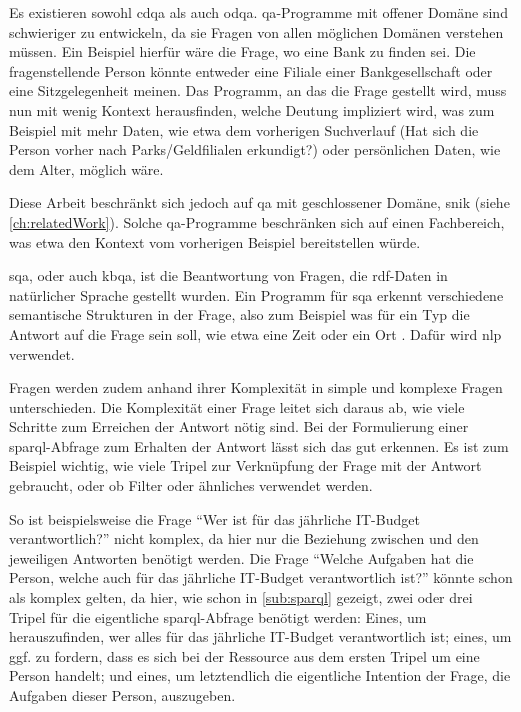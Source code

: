 Es existieren sowohl \ac{cdqa} als auch \ac{odqa}.
\ac{qa}-Programme mit offener Domäne sind schwieriger zu entwickeln,
da sie Fragen von allen möglichen Domänen verstehen müssen.
Ein Beispiel hierfür wäre die Frage, wo eine Bank zu finden sei.
Die fragenstellende Person könnte entweder eine Filiale einer Bankgesellschaft oder eine Sitzgelegenheit meinen.
Das Programm, an das die Frage gestellt wird, muss nun mit wenig Kontext herausfinden,
welche Deutung impliziert wird, was zum Beispiel mit mehr Daten,
wie etwa dem vorherigen Suchverlauf (Hat sich die Person vorher nach Parks/Geldfilialen erkundigt?)
oder persönlichen Daten, wie dem Alter, möglich wäre.

Diese Arbeit beschränkt sich jedoch auf \ac{qa} mit geschlossener Domäne, \acs{snik} (siehe \cref{ch:relatedWork}).
Solche \ac{qa}-Programme beschränken sich auf einen Fachbereich,
was etwa den Kontext vom vorherigen Beispiel bereitstellen würde.

\begin{definition}
\ac{sqa}, oder auch \ac{kbqa}, ist die Beantwortung von Fragen, die \ac{rdf}-Daten in natürlicher Sprache gestellt wurden.
Ein Programm für \ac{sqa} erkennt verschiedene semantische Strukturen in der Frage,
also zum Beispiel was für ein Typ die Antwort auf die Frage sein soll, wie etwa eine Zeit oder ein Ort \citep{sqadefinition}.
Dafür wird \acs{nlp} verwendet.
\end{definition}

Fragen werden zudem anhand ihrer Komplexität in simple und komplexe Fragen unterschieden.
Die Komplexität einer Frage leitet sich daraus ab, wie viele Schritte zum Erreichen der Antwort nötig sind.
Bei der Formulierung einer \ac{sparql}-Abfrage zum Erhalten der Antwort lässt sich das gut erkennen.
Es ist zum Beispiel wichtig, wie viele Tripel zur Verknüpfung der Frage mit der Antwort gebraucht, oder ob Filter oder ähnliches verwendet werden.

So ist beispielsweise die Frage \enquote{Wer ist für das jährliche IT-Budget verantwortlich?} nicht komplex,
da hier nur die Beziehung zwischen  und den jeweiligen Antworten benötigt werden.
Die Frage \enquote{Welche Aufgaben hat die Person, welche auch für das jährliche IT-Budget verantwortlich ist?} könnte schon als komplex gelten, da hier, wie schon in \cref{sub:sparql} gezeigt,
zwei oder drei Tripel für die eigentliche \ac{sparql}-Abfrage benötigt werden:
Eines, um herauszufinden, wer alles für das jährliche IT-Budget verantwortlich ist;
eines, um ggf. zu fordern, dass es sich bei der Ressource aus dem ersten Tripel um eine Person handelt;
und eines, um letztendlich die eigentliche Intention der Frage, die Aufgaben dieser Person, auszugeben.

